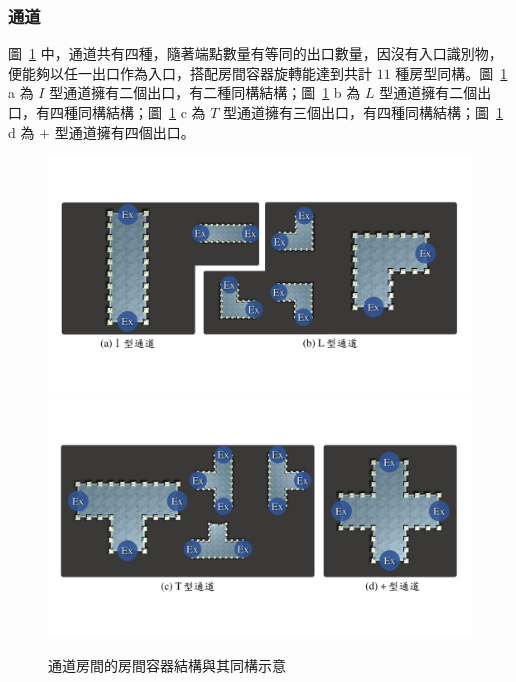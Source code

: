 \subsubsection{通道}
\label{sssec:method-spacepieces-types-path}

圖~\ref{fig:roomtype-mainpath-ii} 中，通道共有四種，隨著端點數量有等同的出口數量，因沒有入口識別物，便能夠以任一出口作為入口，搭配房間容器旋轉能達到共計 $11$ 種房型同構。圖~\ref{fig:roomtype-mainpath-ii} a 為 $I$ 型通道擁有二個出口，有二種同構結構；圖~\ref{fig:roomtype-mainpath-ii} b 為 $L$ 型通道擁有二個出口，有四種同構結構；圖~\ref{fig:roomtype-mainpath-ii} c 為 $T$ 型通道擁有三個出口，有四種同構結構；圖~\ref{fig:roomtype-mainpath-ii} d 為 $+$ 型通道擁有四個出口。

\begin{figure}[!htb]
  \begin{center}
    \includegraphics[width=1.0\textwidth]{figures/roomtype-mainpath-ii.pdf}
    \includegraphics[width=1.0\textwidth]{figures/roomtype-mainpath-ii-.pdf}
    \caption{通道房間的房間容器結構與其同構示意}
    \label{fig:roomtype-mainpath-ii}
  \end{center}
\end{figure}

